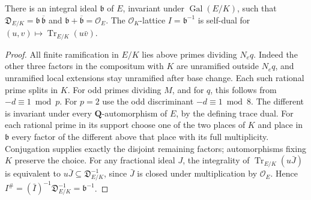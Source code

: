 \begin{lemma}\label{host:different}
There is an integral ideal \(\mathfrak b\) of \(E\), invariant under
\(\operatorname{Gal}(E/K)\), such that
\(\mathfrak D_{E/K}=\mathfrak b\,\overline{\mathfrak b}\) and
\(\mathfrak b+\overline{\mathfrak b}=\mathcal O_E\).
The \(\mathcal O_K\)-lattice \(I=\mathfrak b^{-1}\) is self-dual for
\((u,v)\mapsto\operatorname{Tr}_{E/K}(u\bar v)\).
\end{lemma}
\begin{proof}
All finite ramification in \(E/K\) lies above primes dividing \(N_eq\).
Indeed the other three factors in the compositum with \(K\) are
unramified outside \(N_eq\), and unramified local extensions stay
unramified after base change. Each such rational prime splits in \(K\).
For odd primes dividing \(M\), and for \(q\), this follows from
\(-d\equiv1\bmod p\). For \(p=2\) use the odd discriminant
\(-d\equiv1\bmod8\). The different is invariant under every
\(\mathbf Q\)-automorphism of \(E\), by the defining trace dual.
For each rational prime in its support choose one of the two places of
\(K\) and place in \(\mathfrak b\) every factor of the different above
that place with its full multiplicity. Conjugation supplies exactly
the disjoint remaining factors; automorphisms fixing \(K\) preserve
the choice. For any fractional ideal \(J\), the integrality of
\(\operatorname{Tr}_{E/K}(u\bar J)\) is equivalent to
\(u\bar J\subseteq\mathfrak D_{E/K}^{-1}\), since \(\bar J\) is closed
under multiplication by \(\mathcal O_E\). Hence
\(I^\#=(\bar I)^{-1}\mathfrak D_{E/K}^{-1}=\mathfrak b^{-1}\).
\end{proof}

